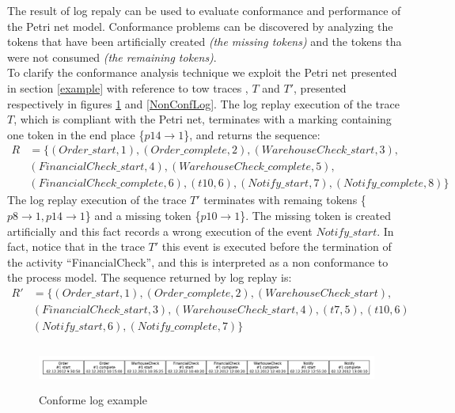 \documentclass[11pt]{article}
\begin{document}
The result of log repaly can be used to evaluate conformance and performance of the Petri net model. Conformance problems can be discovered by analyzing the tokens that have been artificially created {\itshape (the missing tokens)} and the tokens tha were not consumed {\itshape (the remaining tokens)}.\\

To clarify the conformance analysis technique we exploit the Petri net presented in section \ref{example} with reference to tow traces , $T$ and $T'$, presented respectively in figures \ref{ConfLog} and \ref{NonConfLog}. The log replay execution of the trace $T$, which is compliant with the Petri net, terminates with a marking containing one token in the end place \{${p14 \rightarrow 1}$\}, and returns the sequence:
\begin{equation}
\begin{split}
R&=\{(Order\_start,1), (Order\_complete,2),(WarehouseCheck\_start,3), \\
& (FinancialCheck\_start,4),(WarehouseCheck\_complete,5),\\
& (FinancialCheck\_complete,6),(t10, 6), (Notify\_start,7), (Notify\_complete,8)\}
\end{split}
\end{equation}
The log replay execution of the trace $T'$ terminates with remaing tokens \{${p8 \rightarrow 1,p14 \rightarrow 1}$\} and a missing token \{${p10 \rightarrow 1}$\}. The missing token is created artificially and this fact records a wrong execution of the event $Notify\_start$. In fact, notice that in the trace $T'$ this event is executed before the termination of the activity ``FinancialCheck'', and this is interpreted as a non conformance to the process model. The sequence returned by log replay is:
\begin{equation}
\begin{split}
R'&=\{(Order\_start,1), (Order\_complete,2), (WarehouseCheck\_start), \\
& (FinancialCheck\_start,3), (WarehouseCheck\_start,4),(t7,5), (t10,6)\\
& (Notify\_start,6), (Notify\_complete,7)\}
\end{split}
\end{equation}

\begin{figure}[t]\label{ConfLog}
\centering
\includegraphics[width=400pt,height=40pt]
{./items/logConforme.pdf}
\caption{Conforme log example}
\end{figure}
\end{document}
